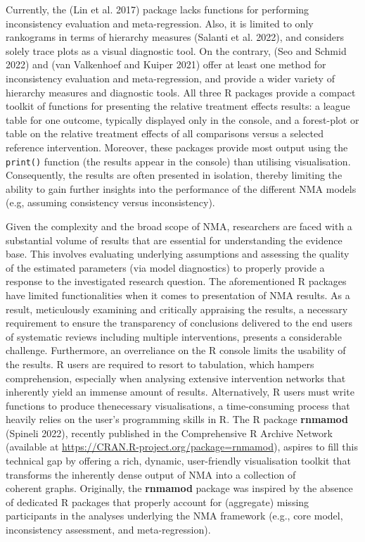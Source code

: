 Currently, the  (Lin et al. 2017) package lacks functions for performing inconsistency evaluation and meta-regression. Also, it is limited to only rankograms in terms of hierarchy
measures (Salanti et al. 2022), and considers solely trace plots as a visual diagnostic tool.
On the contrary,  (Seo and Schmid 2022) and  (van Valkenhoef and Kuiper 2021) offer at least
one method for inconsistency evaluation and meta-regression, and provide a wider variety of hierarchy measures and diagnostic tools. All three R packages provide a compact toolkit
of functions for presenting the relative treatment effects results: a league
table for one outcome, typically displayed only in the console, and a forest-plot or table
on the relative treatment effects of all comparisons versus a selected reference intervention.
Moreover, these packages provide most output using the \texttt{print()} function (the results appear in the
console) than utilising visualisation. Consequently, the results are often presented in isolation, thereby limiting the ability to gain further insights into the performance of the different NMA models
(e.g, assuming consistency versus inconsistency).

Given the complexity and the broad scope of NMA, researchers are faced with
a substantial volume of results that are essential for understanding the evidence base. This involves
evaluating underlying assumptions and assessing the quality of the estimated parameters (via model
diagnostics) to properly provide a response to the investigated research question.
The aforementioned R packages have limited functionalities when it comes to presentation of NMA results.
As a result, meticulously examining and critically appraising the results, a necessary requirement to ensure the transparency of conclusions delivered to the end users of systematic reviews including multiple interventions, presents a considerable challenge.
Furthermore, an overreliance on the R console limits the usability of the results. R users are required to resort to tabulation, which hampers comprehension, especially when analysing extensive intervention networks that inherently yield an immense amount of results. Alternatively, R users must write functions to produce thenecessary visualisations, a time-consuming process that heavily relies on the user's programming skills in R.
The R package \textbf{rnmamod} (Spineli 2022), recently published in the Comprehensive R Archive
Network (available at
\url{https://CRAN.R-project.org/package=rnmamod}),
aspires to fill this technical gap by offering a rich, dynamic, user-friendly
visualisation toolkit that transforms the inherently dense output of NMA into a collection of\\
coherent graphs. Originally, the \textbf{rnmamod} package was inspired by the absence of dedicated
R packages that properly account for (aggregate) missing participants in the analyses
underlying the NMA framework (e.g., core model, inconsistency assessment, and
meta-regression).

